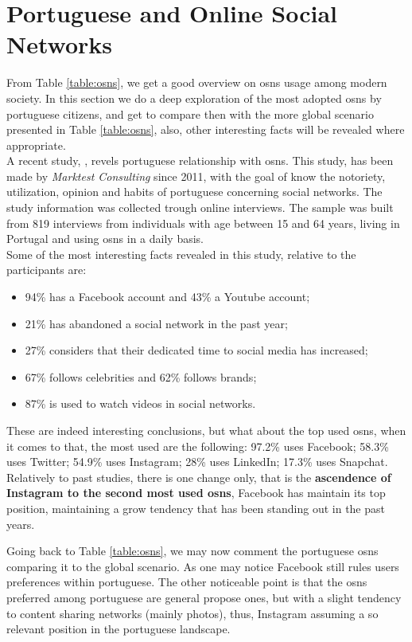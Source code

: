 \section{Portuguese and Online Social Networks}
From Table \ref{table:osns}, we get a good overview on \glspl{osn} usage among modern society. In this section we do a deep exploration of the most adopted \glspl{osn} by portuguese citizens,
and get to compare then with the more global scenario presented in Table \ref{table:osns}, also, other interesting facts will be revealed where appropriate.\\
\indent A recent study, \cite{marktest2016}, revels portuguese relationship with \glspl{osn}. This study, has been made by \textit{Marktest Consulting} since 2011, with the goal of know the notoriety, utilization, opinion
and habits of portuguese concerning social networks. The study information was collected trough online interviews. The sample was built from 819 interviews from individuals with age between
15 and 64 years, living in Portugal and using \glspl{osn} in a daily basis.\\
\indent Some of the most interesting facts revealed in this study, relative to the participants are:
\begin{itemize}
  \item 94\% has a Facebook account and 43\% a Youtube account;
  \item 21\% has abandoned a social network in the past year;
  \item 27\% considers that their dedicated time to social media has increased;
  \item 67\% follows celebrities and 62\% follows brands;
  \item 87\% is used to watch videos in social networks.
\end{itemize}

\indent These are indeed interesting conclusions, but what about the top used \glspl{osn}, when it comes to that, the most used are the following: 97.2\% uses Facebook; 58.3\% uses Twitter; 54.9\% uses Instagram; 28\% uses LinkedIn;
17.3\% uses Snapchat.\\
\indent Relatively to \cite{marktest2016} past studies, there is one change only, that is the \textbf{ascendence of Instagram to the second most used \glspl{osn}}, Facebook has maintain
its top position, maintaining a grow tendency that has been standing out in the past years.

\indent Going back to Table \ref{table:osns}, we may now comment the portuguese \glspl{osn} comparing it
to the global scenario. As one may notice Facebook still rules users preferences within portuguese.
The other noticeable point is that the \glspl{osn} preferred among portuguese are general propose ones,
but with a slight tendency to content sharing networks (mainly photos), thus, Instagram assuming
a so relevant position in the portuguese landscape.

